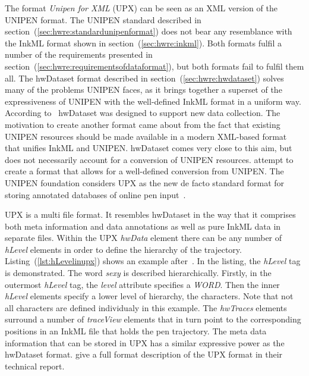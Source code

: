 The format \emph{Unipen for XML} (UPX) can be seen as an XML version of the
UNIPEN format. The UNIPEN standard described in 
section~(\ref{sec:hwre:standardunipenformat}) does not bear any resemblance
with the InkML format shown in section~(\ref{sec:hwre:inkml}).
Both formats fulfil a number of the requirements presented in 
section~(\ref{sec:hwre:requirementsofdataformat}), but both formats fail to 
fulfil them all. The hwDataset format described in 
section~(\ref{sec:hwre:hwdataset}) solves many of the problems UNIPEN faces,
as it brings together a superset of the expressiveness of UNIPEN with
the well-defined InkML format in a uniform way.
According to~ \citeyear{Agrawal2005} hwDataset
was designed to support new data collection. The motivation to create another
format came about from the fact that existing UNIPEN resources should be made
available in a modern XML-based format that unifies InkML and UNIPEN.
hwDataset comes very close to this aim, but does not necessarily account for a 
conversion of UNIPEN resources.  \citeyear{Agrawal2005}
attempt to create a format that allows for a well-defined conversion from UNIPEN.
The UNIPEN foundation considers UPX as the new de facto standard format for 
storing annotated databases of online pen input~.

UPX is a multi file format. It resembles hwDataset in the way that it comprises 
both meta information and data annotations as well as pure InkML data in 
separate files. Within the UPX \emph{hwData} element there can be any number
of \emph{hLevel} elements in order to define the hierarchy of the trajectory.
Listing~(\ref{lst:hLevelinupx}) shows an example 
after~. In the listing, the \emph{hLevel} tag
is demonstrated. The word \emph{sexy} is described hierarchically.
Firstly, in the outermost \emph{hLevel} tag, the \emph{level} attribute specifies
a \emph{WORD}. Then the inner \emph{hLevel} elements specify a lower level
of hierarchy, the characters. Note that not all characters are defined
individualy in this example.
The \emph{hwTraces} elements surround a number of \emph{traceView} elements that
in turn point to the corresponding positions in an InkML file that holds the 
pen trajectory. The meta data information that can be stored in UPX has a 
similar expressive power as the hwDataset format.
 \citeyear{Madhvanath2006} give a full format 
description of the UPX format in their technical report.

